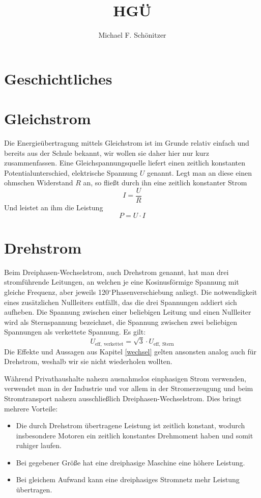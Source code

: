 \documentclass[10pt,a4paper]{article}
\author{Michael F. Schönitzer}
\title{HGÜ}
\newcommand{\degree}{$^\circ$}
\begin{document}
\maketitle

\section{Geschichtliches}

\section{Gleichstrom}
Die Energieübertragung mittels Gleichstrom ist im Grunde relativ einfach und bereits aus der Schule bekannt, wir wollen sie daher hier nur kurz zusammenfassen.
Eine Gleichspannungsquelle liefert einen zeitlich konstanten Potentialunterschied, elektrische Spannung $U$ genannt. Legt man an diese einen ohmschen Widerstand $R$ an, so fließt durch ihn eine zeitlich konstanter Strom
\begin{equation}
I = \frac{U}{R}
\end{equation}
Und leistet an ihm die Leistung
\begin{equation}
P = U \cdot I
\end{equation}




\section{Drehstrom}
Beim Dreiphasen-Wechselstrom, auch Drehstrom genannt, hat man drei stromführende Leitungen, an welchen je eine Kosinusförmige Spannung mit gleiche Frequenz, aber jeweils 120\degree Phasenverschiebung anliegt.
Die notwendigkeit eines zusätzlichen Nullleiters entfällt, das die drei Spannungen addiert sich aufheben.
Die Spannung zwischen einer beliebigen Leitung und einen Nullleiter wird als Sternspannung bezeichnet,
die Spannung zwischen zwei beliebigen Spannungen als verkettete Spannung. Es gilt:
\begin{equation}
U_{\mathrm{eff},\:\mathrm{verkettet}} = \sqrt{3} \cdot U_{\mathrm{eff},\:\mathrm{Stern}}
\end{equation}
Die Effekte und Aussagen aus Kapitel \ref{wechsel} gelten ansonsten analog auch für Drehstrom, weshalb wir sie nicht wiederholen wollten.

Während Privathaushalte nahezu ausnahmslos einphasigen Strom verwenden, verwendet man in der Industrie und vor allem in der Stromerzeugung und beim Stromtransport nahezu ausschließlich Dreiphasen-Wechselstrom. Dies bringt mehrere Vorteile\cite{Harrison}:
\begin{itemize}
\item Die durch Drehstrom übertragene Leistung ist zeitlich konstant, wodurch insbesondere Motoren ein zeitlich konstantes Drehmoment haben und somit ruhiger laufen.
\item Bei gegebener Größe hat eine dreiphasige Maschine eine höhere Leistung.
\item Bei gleichem Aufwand kann eine dreiphasiges Stromnetz mehr Leistung übertragen.
\end{itemize}
\end{document}
